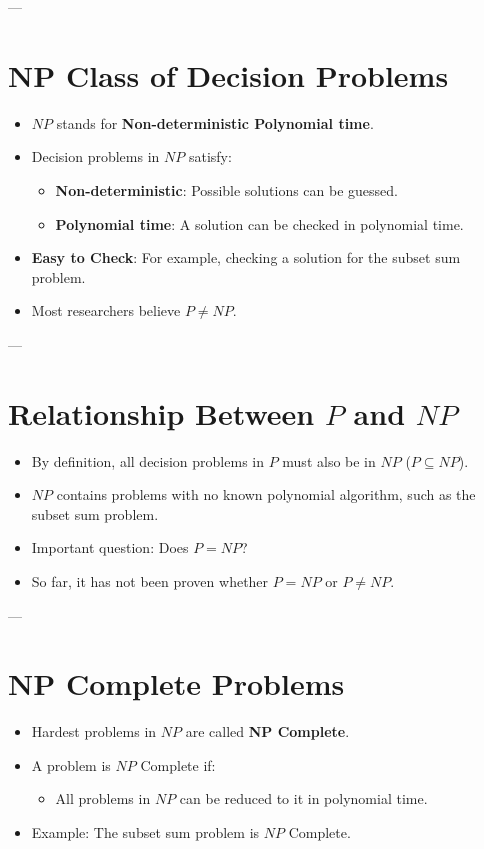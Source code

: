 \documentclass[a4paper,12pt]{article}
\begin{document}
---

\section*{NP Class of Decision Problems}

\begin{itemize}[label=$\bullet$]
    \item \(NP\) stands for \textbf{Non-deterministic Polynomial time}.
    \item Decision problems in \(NP\) satisfy:
    \begin{itemize}
        \item \textbf{Non-deterministic}: Possible solutions can be guessed.
        \item \textbf{Polynomial time}: A solution can be checked in polynomial time.
    \end{itemize}
    \item \textbf{Easy to Check}: For example, checking a solution for the subset sum problem.
    \item Most researchers believe \(P \neq NP\).
\end{itemize}

---

\section*{Relationship Between \(P\) and \(NP\)}

\begin{itemize}[label=$\bullet$]
    \item By definition, all decision problems in \(P\) must also be in \(NP\) (\(P \subseteq NP\)).
    \item \(NP\) contains problems with no known polynomial algorithm, such as the subset sum problem.
    \item Important question: Does \(P = NP\)?
    \item So far, it has not been proven whether \(P = NP\) or \(P \neq NP\).
\end{itemize}

---

\section*{NP Complete Problems}

\begin{itemize}[label=$\bullet$]
    \item Hardest problems in \(NP\) are called \textbf{NP Complete}.
    \item A problem is \(NP\) Complete if:
    \begin{itemize}
        \item All problems in \(NP\) can be reduced to it in polynomial time.
    \end{itemize}
    \item Example: The subset sum problem is \(NP\) Complete.
\end{itemize}
\end{document}
